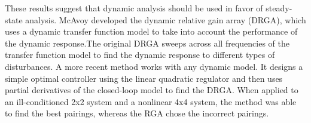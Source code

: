 These results suggest that dynamic analysis should be used in favor of steady-state analysis. McAvoy developed the dynamic relative gain array (DRGA), which uses a dynamic transfer function model to take into account the performance of the dynamic response.\citep{Riggs2006}\footnotemark The original DRGA sweeps across all frequencies of the transfer function model to find the dynamic response to different types of disturbances. A more recent method works with any dynamic model.\citep{McAvoy2003} It designs a simple optimal controller using the linear quadratic regulator and then uses partial derivatives of the closed-loop model to find the DRGA. When applied to an ill-conditioned 2x2 system and a nonlinear 4x4 system, the method was able to find the best pairings, whereas the RGA chose the incorrect pairings. 


%
%

